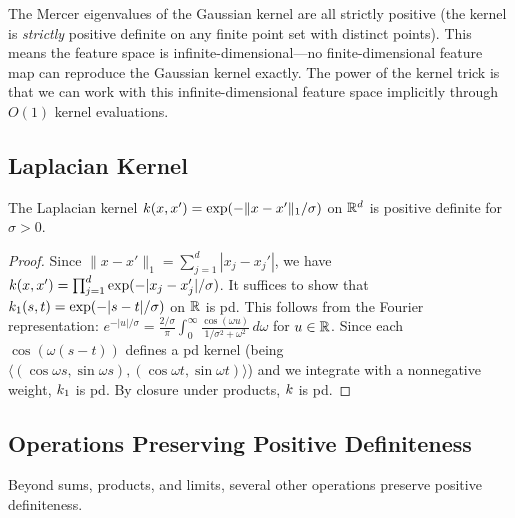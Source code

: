 \documentclass[11pt,a4paper]{article}
\begin{document}
\begin{remark}
\label{rem:gaussian-infinite-dim}
The Mercer eigenvalues of the Gaussian kernel are all strictly
positive (the kernel is \emph{strictly} positive definite on any
finite point set with distinct points). This means the feature
space is infinite-dimensional---no finite-dimensional feature
map can reproduce the Gaussian kernel exactly. The power of the
kernel trick is that we can work with this infinite-dimensional
feature space implicitly through $O(1)$ kernel evaluations.
\end{remark}

\subsection{Laplacian Kernel}

\begin{proposition}
\label{prop:laplacian-pd}
The Laplacian kernel $k(x, x') = \exp(-\|x - x'\|_1 / \sigma)$
on $\mathbb{R}^d$ is positive definite for $\sigma > 0$.
\end{proposition}

\begin{proof}
Since $\|x - x'\|_1 = \sum_{j=1}^d |x_j - x_j'|$, we have
$k(x, x') = \prod_{j=1}^d \exp(-|x_j - x_j'| / \sigma)$.
It suffices to show that $k_1(s, t) = \exp(-|s - t| / \sigma)$
on $\mathbb{R}$ is pd. This follows from the Fourier representation:
$e^{-|u|/\sigma} = \frac{2/\sigma}{\pi} \int_0^\infty
\frac{\cos(\omega u)}{1/\sigma^2 + \omega^2} \, d\omega$
for $u \in \mathbb{R}$. Since each $\cos(\omega(s-t))$ defines a pd kernel
(being $\langle (\cos \omega s, \sin \omega s),
(\cos \omega t, \sin \omega t) \rangle$) and we integrate with a
nonneg\-ative weight, $k_1$ is pd. By closure under products,
$k$ is pd.
\end{proof}

\subsection{Operations Preserving Positive Definiteness}

Beyond sums, products, and limits, several other operations preserve
positive definiteness.
\end{document}
